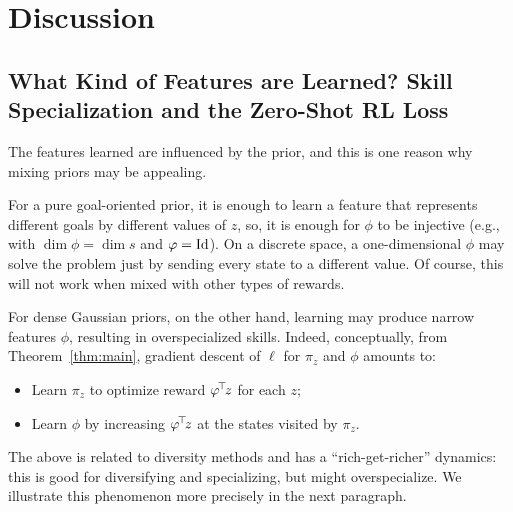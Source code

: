 \documentclass[11pt,a4paper]{article}
\begin{document}
\section{Discussion}

\subsection{What Kind of Features are Learned? Skill Specialization and the Zero-Shot RL Loss}
\label{sec:whatfeatures}

The features
learned are influenced by the prior, and this is one reason why mixing
priors may be appealing.

For a pure goal-oriented prior, it is enough to learn a feature that
represents different goals by different values of $z$, so, it is enough
for $\phi$ to be injective (e.g., with $\dim \phi= \dim s$ and
$\varphi=\operatorname{Id}$). On a discrete space, a one-dimensional $\phi$ may solve the
problem just by sending every state to a different value. Of course, this
will not work when mixed with other types of rewards.

For dense Gaussian priors, on the other hand, learning may produce
narrow features $\phi$, resulting in overspecialized skills. Indeed, 
conceptually, from Theorem~\ref{thm:main}, gradient descent of $\ell$ for $\pi_z$ and $\phi$ amounts
to:
\begin{itemize}
\item Learn $\pi_z$ to optimize reward $\varphi^{\!\top}\!z$ for each $z$;
\item Learn $\phi$ by increasing $\varphi^{\!\top}\!z$ at the states visited
by $\pi_z$.
\end{itemize}

The above is related to diversity methods \cite{eysenbach2018diversity}
and has a ``rich-get-richer'' dynamics: this is good for diversifying and
specializing, but might overspecialize. We illustrate this phenomenon
more precisely in the next paragraph.
\end{document}
